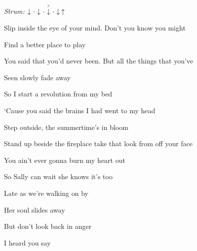 \begin{song}


\begin{strumbox}
\textit{Strum:} $\Down\Miss\Down\Miss\AccentDown\Miss\Down\Up$
\end{strumbox}

\begin{vchordbox}
\vspace{2em}
\end{vchordbox}

\large

\bigskip

\Intro {}    \par

\bigskip

Slip inside the eye of your mind. Don't you know you might \par
{}Find  a better place to play  \par
{}You said that you'd never been. But all the things that you've \par
{}Seen  slowly fade away  \par

\bigskip

\begin{chorusbox}{\Prechorus}
 So I start a revolution from my bed \par
‘Cause you said the brains I had went to my head \par
{}Step outside, the summertime’s in bloom \par
{}Stand up beside the fireplace take that look from off your face \par
{}You ain’t ever gonna burn my heart out \par
{} \par
\end{chorusbox}

\bigskip

So Sally can wait she knows it’s too \par
{}Late as we’re walking on by  \par
Her soul slides away  \par
But don’t look back in anger  \par
I heard you say    \par
{}    \par


\end{song}

